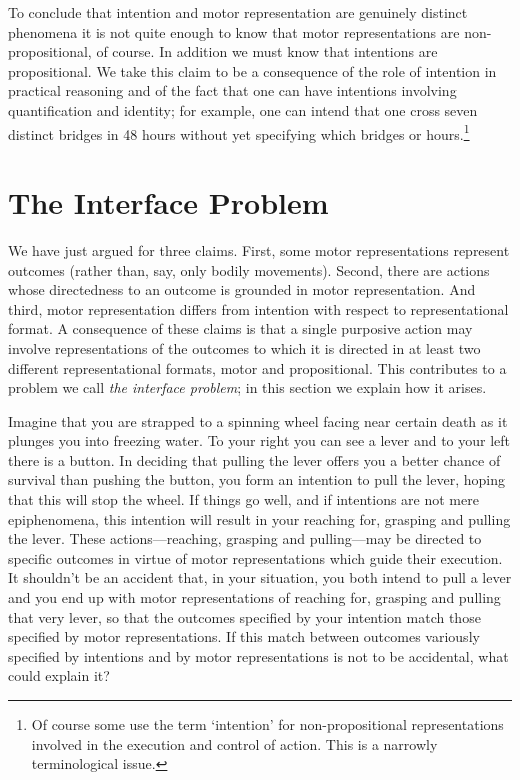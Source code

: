 \documentclass[12pt,\papersize]{extarticle}
\begin{document}
To conclude that intention and motor representation are genuinely distinct phenomena it is not quite enough to know that motor representations are non-propositional, of course. In addition we must know that intentions are propositional. We take this claim to be a consequence of the role of intention in practical reasoning and of the fact that one can have intentions involving quantification and identity; for example, one can intend that one cross seven distinct bridges in 48 hours without yet specifying which bridges or hours.\footnote{ Of course some use the term `intention' for non-propositional representations involved in the execution and control of action.  This is a narrowly terminological issue.} 



\section{The Interface Problem}

We have just argued for three claims. First, some motor representations represent outcomes (rather than, say, only bodily movements). Second, there are actions whose directedness to an outcome is grounded in motor representation. And third, motor representation differs from intention with respect to representational format. A consequence of these claims is that a single purposive action may involve representations of the outcomes to which it is directed in at least two different representational formats, motor and propositional. This contributes to a problem we call \emph{the interface problem}; in this section we explain how it arises.  

Imagine that you are strapped to a spinning wheel facing near certain death as it plunges you into freezing water. To your right you can see a lever and to your left there is a button. In deciding that pulling the lever offers you a better chance of survival than pushing the button, you form an intention to pull the lever, hoping that this will stop the wheel. If things go well, and if intentions are not mere epiphenomena, this intention will result in your reaching for, grasping and pulling the lever. These actions---reaching, grasping and pulling---may be directed to specific outcomes in virtue of motor representations which guide their execution. It shouldn't be an accident that, in your situation, you both intend to pull a lever and you end up with motor representations of reaching for, grasping and pulling that very lever, so that the outcomes specified by your intention match those specified by motor representations. If this match between outcomes variously specified by intentions and by motor representations is not to be accidental, what could explain it?  
\end{document}
